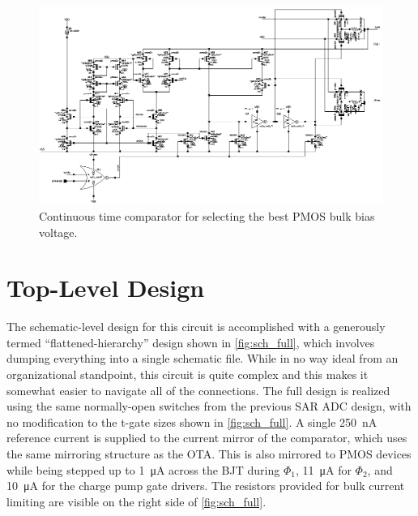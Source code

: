 \documentclass[11pt,letterpaper]{article}
\begin{document}
\begin{figure}[ht]
    \centering
    \includegraphics{images/cp_sch_comp.eps}
    \caption{Continuous time comparator for selecting the best PMOS bulk bias voltage.}\label{fig:comp}
\end{figure}

\section{Top-Level Design}

The schematic-level design for this circuit is accomplished with a generously termed ``flattened-hierarchy'' design shown in \cref{fig:sch_full}, which involves dumping everything into a single schematic file. While in no way ideal from an organizational standpoint, this circuit is quite complex and this makes it somewhat easier to navigate all of the connections. The full design is realized using the same normally-open switches from the previous SAR ADC design, with no modification to the t-gate sizes shown in \cref{fig:sch_full}. A single \qty{250}{\nA} reference current is supplied to the current mirror of the comparator, which uses the same mirroring structure as the OTA. This is also mirrored to PMOS devices while being stepped up to \qty{1}{\uA} across the BJT during \(\Phi_1\), \qty{11}{\uA} for \(\Phi_2\), and \qty{10}{\uA} for the charge pump gate drivers. The resistors provided for bulk current limiting are visible on the right side of \cref{fig:sch_full}.
\end{document}
